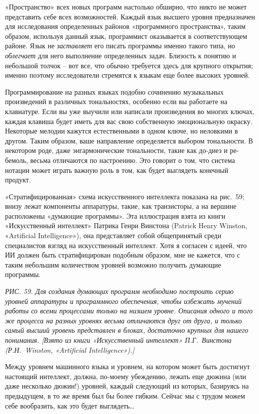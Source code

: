 \documentclass[../main.tex]{subfiles}
\begin{document}
«Пространство» всех новых программ настолько обширно, что никто не может представить себе всех возможностей. Каждый язык высшего уровня предназначен для исследования определенных районов «программного пространства», таким образом, используя данный язык, программист оказывается в соответствующем районе. Язык не \emph{заставляет} его писать программы именно такого типа, но \emph{облегчает} для него выполнение определенных задач. Близость к понятию и небольшой толчок \--- вот все, что обычно требуется здесь для крупного открытия; именно поэтому исследователи стремятся к языкам еще более высоких уровней.

Программирование на разных языках подобно сочинению музыкальных произведений в различных тональностях, особенно если вы работаете на клавиатуре. Если вы уже выучили или написали произведения во многих ключах, каждая клавиша будет иметь для вас свою собственную эмоциональную окраску. Некоторые мелодии кажутся естественными в одном ключе, но неловкими в другом. Таким образом, ваше направление определяется выбором тональности. В некотором роде, даже энгармонические тональности, такие как до-диез и ре-бемоль, весьма отличаются по настроению. Это говорит о том, что система нотации может играть важную роль в том, как будет выглядеть конечный продукт.

«Стратифицированная» схема искусственного интеллекта показана на рис.~59; внизу лежат компоненты аппаратуры, такие, как транзисторы, а на вершине расположены «думающие программы». Эта иллюстрация взята из книги «Искусственный интеллект» Патрика Генри Винстона (Patrick Henry Winston, «Artificial Intelligence»), она представляет собой общепринятый среди специалистов взгляд на искусственный интеллект. Хотя я согласен с идеей, что ИИ должен быть стратифицирован подобным образом, мне не кажется, что с таким небольшим количеством уровней возможно получить думающие программы.

\emph{РИС. 59. Для создания думающих программ необходимо построить серию уровней аппаратуры и программного обеспечения, чтобы избежать мучений работы со всеми процессами только на низшем уровне. Описания одного и того же процесса на разных уровнях весьма отличаются друг от друга, и только самый высший уровень представлен в блоках, достаточно крупных для нашего понимания. {[}Взято из книги «Искусственный интеллект» П.Г.~Винстона (Р.Н.~Winston, «Artificial Intelligence»).{]}}

Между уровнем машинного языка и уровнем, на котором может быть достигнут настоящий интеллект, должна, по-моему убеждению, лежать еще дюжина (или даже несколько дюжин!) уровней, каждый следующий из которых, базируясь на предыдущем, в то же время был бы более гибким. Сейчас мы с трудом можем себе вообразить, как это будет выглядеть\ldots{}
\end{document}
